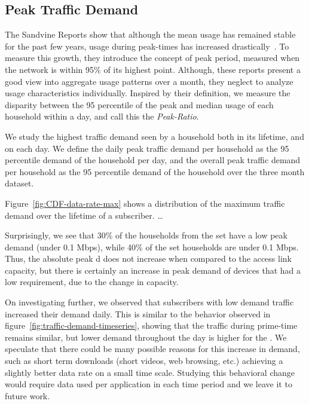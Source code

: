 \subsection{Peak Traffic Demand}\label{subsec:peakratio}

The Sandvine Reports show that although the mean usage has remained
stable for the past few years, usage during peak-times has increased
drastically~\cite{sandvine20141h}. To measure this growth, they introduce the
concept of peak period, measured when the network is within 95\% of its highest 
point. Although, these reports present a good view into aggregate usage 
patterns over a month,
they neglect to analyze usage characteristics individually. Inspired by their
definition, we measure the disparity between the 95 percentile of the peak and 
median
usage of each household within a day, and call this the \emph{Peak-Ratio}.

We study the highest traffic demand seen by a household both in its lifetime, 
and on each day. We define the daily peak traffic demand per household as the 
95 percentile demand of the household per day, and the overall peak traffic 
demand per household  as the 95 percentile demand of the household over the 
three month dataset.

Figure~\ref{fig:CDF-data-rate-max} shows a distribution of the maximum traffic 
demand over the lifetime of a subscriber. \dots

Surprisingly, we see that 30\% of the households from the \test set have a low 
peak demand (under 0.1 Mbps), while 40\% of the \control set households 
are under 0.1 Mbps. Thus, the absolute peak d does not increase when 
compared to the access link capacity, but there is certainly an increase in 
peak demand of devices that  had a low requirement, due to the change in 
capacity.

On investigating further, we observed that subscribers with low demand traffic 
increased their demand daily. This is similar to the behavior observed in 
figure~\ref{fig:traffic-demand-timeseries}, showing that the traffic during 
prime-time remains similar, but lower demand throughout the day  is higher for 
the \test. We speculate that there could be many possible reasons for this 
increase in demand, such as short term downloads (short videos, web browsing, 
etc.) achieving a slightly better data rate on a small time scale. Studying this 
behavioral change would require data used per application in each time period 
and we leave it to future work.

